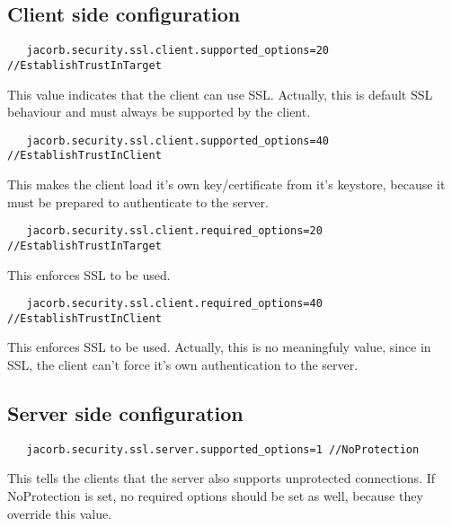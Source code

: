\documentclass[12pt]{scrbook}
\begin{document}

\subsection{Client side configuration}

\begin{verbatim}
   jacorb.security.ssl.client.supported_options=20 //EstablishTrustInTarget
\end{verbatim}
This value indicates that the client can use SSL. Actually, this is default
SSL behaviour and must always be supported by the client.

\begin{verbatim}
   jacorb.security.ssl.client.supported_options=40 //EstablishTrustInClient
\end{verbatim}
This makes the client load it's own key/certificate from it's
keystore, because it must be prepared to authenticate to the server.

\begin{verbatim}
   jacorb.security.ssl.client.required_options=20 //EstablishTrustInTarget
\end{verbatim}
This enforces SSL to be used. 

\begin{verbatim}
   jacorb.security.ssl.client.required_options=40 //EstablishTrustInClient
\end{verbatim}
This enforces SSL to be used. Actually, this is no meaningfuly value, since in
SSL, the client can't force it's own authentication to the server.


\subsection{Server side configuration}

\begin{verbatim}
   jacorb.security.ssl.server.supported_options=1 //NoProtection
\end{verbatim}
This tells the clients that the server also supports unprotected
connections. If NoProtection is set, no required options should be set as
well, because they override this value.
\end{document}
